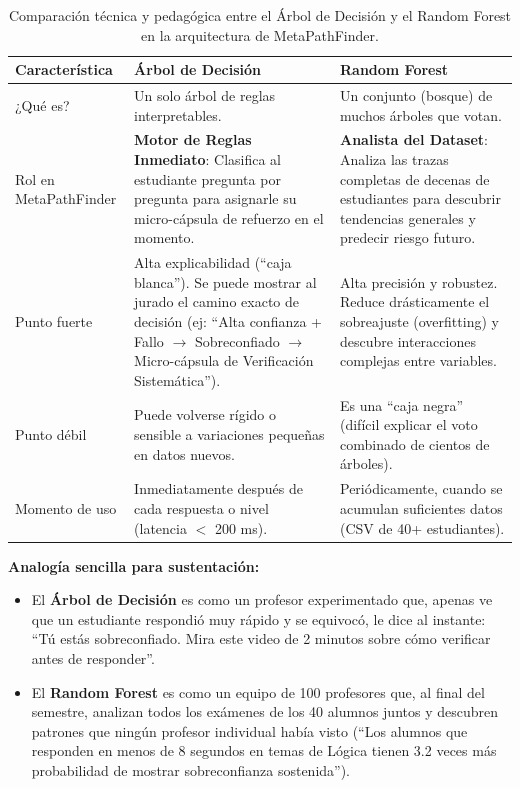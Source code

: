 \documentclass[11pt,a4paper]{article}
\begin{document}
\begin{table}[H]
\centering
\begin{tabular}{@{}p{3.8cm}p{5.5cm}p{5.5cm}@{}}
\toprule
\textbf{Característica} & \textbf{Árbol de Decisión} & \textbf{Random Forest} \\
\midrule
¿Qué es? & Un solo árbol de reglas interpretables. & Un conjunto (bosque) de muchos árboles que votan. \\
\midrule
Rol en MetaPathFinder & \textbf{Motor de Reglas Inmediato}: Clasifica al estudiante pregunta por pregunta para asignarle su micro-cápsula de refuerzo en el momento. & \textbf{Analista del Dataset}: Analiza las trazas completas de decenas de estudiantes para descubrir tendencias generales y predecir riesgo futuro. \\
\midrule
Punto fuerte & Alta explicabilidad (``caja blanca''). Se puede mostrar al jurado el camino exacto de decisión (ej: ``Alta confianza + Fallo $\rightarrow$ Sobreconfiado $\rightarrow$ Micro-cápsula de Verificación Sistemática''). & Alta precisión y robustez. Reduce drásticamente el sobreajuste (overfitting) y descubre interacciones complejas entre variables. \\
\midrule
Punto débil & Puede volverse rígido o sensible a variaciones pequeñas en datos nuevos. & Es una ``caja negra'' (difícil explicar el voto combinado de cientos de árboles). \\
\midrule
Momento de uso & Inmediatamente después de cada respuesta o nivel (latencia $<$ 200 ms). & Periódicamente, cuando se acumulan suficientes datos (CSV de 40+ estudiantes). \\
\bottomrule
\end{tabular}
\caption{Comparación técnica y pedagógica entre el Árbol de Decisión y el Random Forest en la arquitectura de MetaPathFinder.}
\label{tab:ml-comparacion}
\end{table}

\textbf{Analogía sencilla para sustentación:}

\begin{itemize}
    \item El \textbf{Árbol de Decisión} es como un profesor experimentado que, apenas ve que un estudiante respondió muy rápido y se equivocó, le dice al instante: ``Tú estás sobreconfiado. Mira este video de 2 minutos sobre cómo verificar antes de responder''.
    \item El \textbf{Random Forest} es como un equipo de 100 profesores que, al final del semestre, analizan todos los exámenes de los 40 alumnos juntos y descubren patrones que ningún profesor individual había visto (``Los alumnos que responden en menos de 8 segundos en temas de Lógica tienen 3.2 veces más probabilidad de mostrar sobreconfianza sostenida'').
\end{itemize}
\end{document}
